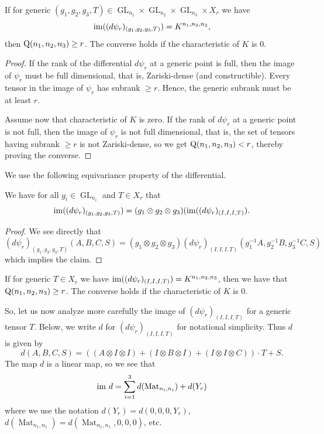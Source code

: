 \documentclass[10pt,a4paper]{article}
\theoremstyle{definition}
\theoremstyle{remark}
\newcommand{\gensubrank}{{\rm Q}}
\newcommand{\GL}{\operatorname{GL}}
\newcommand{\Mat}{\operatorname{Mat}}
\newcommand{\im}{{\rm im}}
\begin{document}
%
\begin{lemma}
If for generic $(g_1,g_2,g_3,T) \in \GL_{n_1} \times \GL_{n_2} \times \GL_{n_3} \times X_r$ we have
\[
\im((d\psi_r)_{(g_1,g_2,g_3,T)}) = K^{n_1,n_2,n_3},
\]
then $\gensubrank(n_1,n_2,n_3) \geq r$. The converse holds if the characteristic of $K$ is $0$.
\end{lemma}

\begin{proof}
If the rank of the differential $d\psi_r$ at a generic point is full, then the image of $\psi_r$ must be full dimensional, that is, Zariski-dense (and constructible). Every tensor in the image of $\psi_r$ has subrank $\geq r$. Hence, the generic subrank must be at least $r$.

Assume now that characteristic of $K$ is zero. If the rank of $d \psi_r$ at a generic point is not full, then the image of $\psi_r$ is not full dimensional, that is, the set of tensors having subrank $\geq r$ is not Zariski-dense, so we get $\gensubrank(n_1,n_2,n_3) < r$, thereby proving the converse.
\end{proof}

%
%
We use the following equivariance property of the differential.

\begin{lemma}
We have for all $g_i \in \GL_{n_i}$ and $T \in X_r$ that
\[
\im( (d\psi_r)_{(g_1,g_2,g_3,T)}) = (g_1 \otimes g_2 \otimes g_3) (\im( (d\psi_r)_{(I,I,I,T)}).
\]
\end{lemma}

\begin{proof}
We see directly that
\[
(d\psi_r)_{(g_1,g_2,g_3,T)} (A,B,C,S) =  (g_1 \otimes g_2 \otimes g_3) (d\psi_r)_{(I,I,I,T)} (g_1^{-1} A, g_2^{-1}B, g_3^{-1}C, S)
\]
which implies the claim.
\end{proof}

%
\begin{corollary} \label{cor:im-d-subrank}
If for generic $T \in X_r$ we have $
\im( (d\psi_r)_{(I,I,I,T)}) = K^{n_1,n_2,n_3}$, then we have that $\gensubrank(n_1,n_2,n_3) \geq r$. The converse holds if the characteristic of $K$ is $0$.
\end{corollary}


So, let us now analyze more carefully the image of $(d\psi_r)_{(I,I,I,T)}$ for a generic tensor $T$. Below, we write $d$ for $(d\psi_r)_{(I,I,I,T)}$ for notational simplicity.
Thus $d$ is given by
\[
d(A,B,C,S) = ((A \otimes I \otimes I) + (I \otimes B \otimes I) + (I \otimes I \otimes C)) \cdot T + S.
\]
The map $d$ is a linear map, so we see that
\[
\im\  d = \sum_{i=1}^3 d(\Mat_{n_i,n_i}) + d(Y_r)
\]
where we use the notation $d(Y_r) = d(0,0,0,Y_r)$,  $d(\Mat_{n_1, n_1}) = d(\Mat_{n_1, n_1}, 0,0,0)$, etc.
\end{document}
